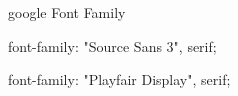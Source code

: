 



google Font Family

font-family: "Source Sans 3", serif;

font-family: "Playfair Display", serif;